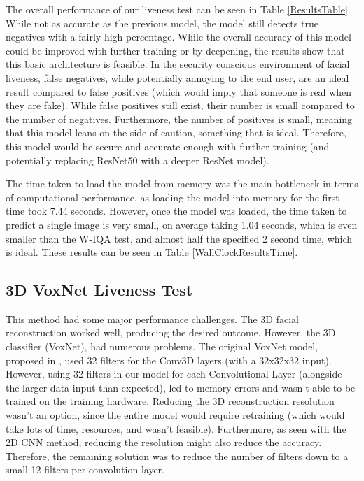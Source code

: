 \documentclass[11pt,a4paper]{article}
\begin{document}
        The overall performance of our liveness test can be seen in Table \ref{ResultsTable}. While not as accurate as the previous model, the model still detects true negatives with a fairly high percentage.
        While the overall accuracy of this model could be improved with further training or by deepening, the results show that this basic architecture is feasible. In the security conscious environment of facial liveness,
        false negatives, while potentially annoying to the end user, are an ideal result compared to false positives (which would imply that someone is real when they are fake). While false positives still exist, their number is small compared to the number of negatives.
        Furthermore, the number of positives is small, meaning that this model leans on the side of caution, something that is ideal. Therefore, this model would be secure and accurate enough with further training (and potentially replacing ResNet50 with a deeper ResNet model).

        The time taken to load the model from memory was the main bottleneck in terms of computational performance, as loading the model into memory for the first time took 7.44 seconds. However, once the model was loaded,
        the time taken to predict a single image is very small, on average taking 1.04 seconds, which is even smaller than the W-IQA test, and almost half the specified 2 second time, which is ideal. These results can be seen in Table \ref{WallClockResultsTime}.     

    
    \subsection{3D VoxNet Liveness Test}
        This method had some major performance challenges. The 3D facial reconstruction worked well, producing the desired outcome. However, the 3D classifier (VoxNet), had numerous problems.
        The original VoxNet model, proposed in \cite{VoxNetModel}, used 32 filters for the Conv3D layers (with a 32x32x32 input). However, using 32 filters in our model for each Convolutional Layer (alongside the larger data input than expected),
        led to memory errors and wasn't able to be trained on the training hardware.  Reducing the 3D reconstruction resolution wasn't an option, since the entire model would require retraining (which would take lots of time, resources, and wasn't feasible).
        Furthermore, as seen with the 2D CNN method, reducing the resolution might also reduce the accuracy. Therefore, the remaining solution was to reduce the number of filters down to a small 12 filters per convolution layer.
\end{document}
